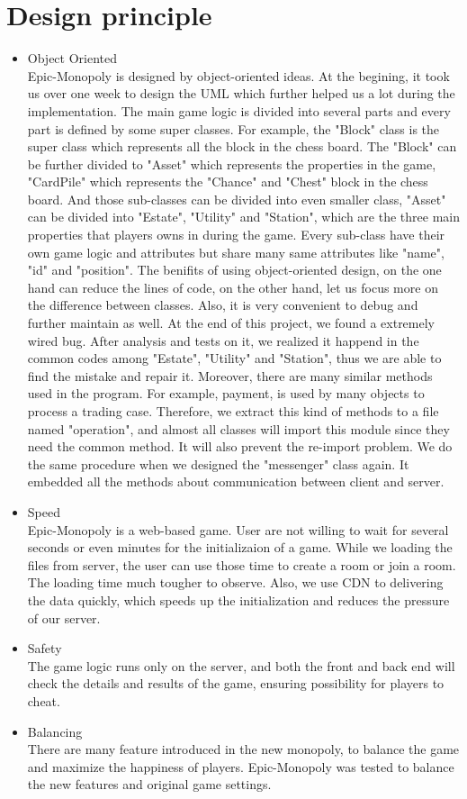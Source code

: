 \documentclass[a4paper,12pt]{article}
\begin{document}
\section{Design principle}
\begin{itemize}
	\item Object Oriented\\  
    Epic-Monopoly is designed by object-oriented ideas. At the begining, it took us over one week to design the UML which further helped us a lot during the implementation. The main game logic is divided into several parts and every part is defined by some super classes. For example, the "Block" class is the super class which represents all the block in the chess board. The "Block" can be further divided to "Asset" which represents the properties in the game, "CardPile" which represents the "Chance" and "Chest" block in the chess board. And those sub-classes can be divided into even smaller class, "Asset" can be divided into "Estate", "Utility" and "Station", which are the three main properties that players owns in during the game. Every sub-class have their own game logic and attributes but share many same attributes like "name", "id" and "position". The benifits of using object-oriented design, on the one hand can reduce the lines of code, on the other hand, let us focus more on the difference between classes. Also, it is very convenient to debug and further maintain as well. At the end of this project, we found a extremely wired bug. After analysis and tests on it, we realized it happend in the common codes among "Estate", "Utility" and "Station", thus we are able to find the mistake and repair it.
    Moreover, there are many similar methods used in the program. For example, payment, is used by many objects to process a trading case. Therefore, we extract this kind of methods to a file named "operation", and almost all classes will import this module since they need the common method. It will also prevent the re-import problem. We do the same procedure when we designed the "messenger" class again. It embedded all the methods about communication between client and server.
	\item Speed\\
    Epic-Monopoly is a web-based game. User are not willing to wait for several seconds or even minutes for the initializaion of a game. While we loading the files from server, the user can use those time to create a room or join a room. The loading time much tougher to observe. Also, we use CDN to delivering the data quickly, which speeds up the initialization and reduces the pressure of our server.
	\item Safety\\
    The game logic runs only on the server, and both the front and back end will check the details and results of the game, ensuring possibility for players to cheat.
	\item Balancing\\
    There are many feature introduced in the new monopoly, to balance the game and maximize the happiness of players. Epic-Monopoly was tested to balance the new features and original game settings.
\end{itemize}
\end{document}
